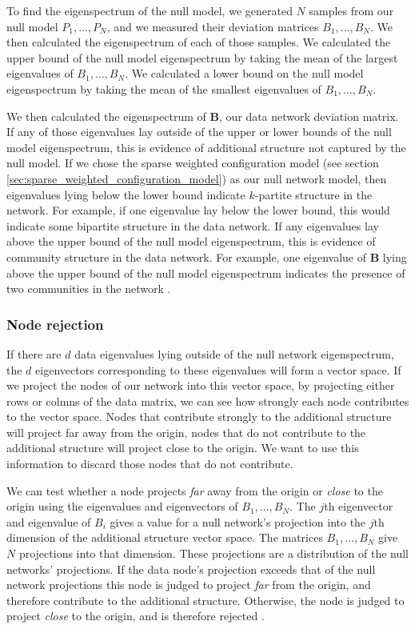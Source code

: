 \documentclass[a4paper,12pt]{article}
\theoremstyle{definition}
\begin{document}
        To find the eigenspectrum of the null model, we generated $N$ samples from our null model $P_1, \dots, P_N$, and we measured their deviation matrices $B_1, \dots, B_N$. We then calculated the eigenspectrum of each of those samples. We calculated the upper bound of the null model eigenspectrum by taking the mean of the largest eigenvalues of $B_1, \dots, B_N$. We calculated a lower bound on the null model eigenspectrum by taking the mean of the smallest eigenvalues of $B_1, \dots, B_N$.

        We then calculated the eigenspectrum of $\mathbf{B}$, our data network deviation matrix. If any of those eigenvalues lay outside of the upper or lower bounds of the null model eigenspectrum, this is evidence of additional structure not captured by the null model. If we chose the sparse weighted configuration model (see section \ref{sec:sparse_weighted_configuration_model}) as our null network model, then eigenvalues lying below the lower bound indicate $k$-partite structure in the network. For example, if one eigenvalue lay below the lower bound, this would indicate some bipartite structure in the data network. If any eigenvalues lay above the upper bound of the null model eigenspectrum, this is evidence of community structure in the data network. For example, one eigenvalue of $\mathbf{B}$ lying above the upper bound of the null model eigenspectrum indicates the presence of two communities in the network \cite{humphries2}.

        \subsubsection{Node rejection}\label{sec:node_rejection}
        If there are $d$ data eigenvalues lying outside of the null network eigenspectrum, the $d$ eigenvectors corresponding to these eigenvalues will form a vector space. If we project the nodes of our network into this vector space, by projecting either rows or colmns of the data matrix, we can see how strongly each node contributes to the vector space. Nodes that contribute strongly to the additional structure will project far away from the origin, nodes that do not contribute to the additional structure will project close to the origin. We want to use this information to discard those nodes that do not contribute.

        We can test whether a node projects \textit{far} away from the origin or \textit{close} to the origin using the eigenvalues and eigenvectors of $B_1, \dots, B_N$. The $j$th eigenvector and eigenvalue of $B_i$ gives a value for a null network's projection into the $j$th dimension of the additional structure vector space. The matrices $B_1, \dots, B_N$ give $N$ projections into that dimension. These projections are a distribution of the null networks' projections. If the data node's projection exceeds that of the null network projections this node is judged to project \textit{far} from the origin, and therefore contribute to the additional structure. Otherwise, the node is judged to project \textit{close} to the origin, and is therefore rejected \cite{humphries}.
\end{document}
